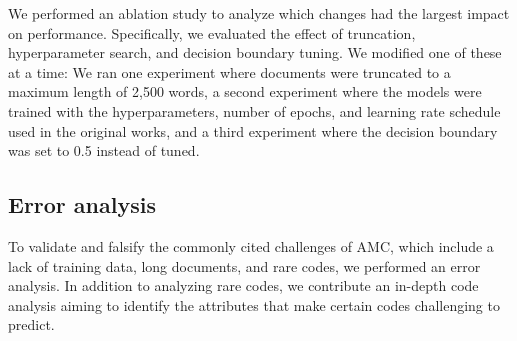 \documentclass[anonymous=false, sigconf=true, review=false, natbib=true]{acmart}
\begin{document}
We performed an ablation study to analyze which changes had the largest impact on performance. 
Specifically, we evaluated the effect of truncation, hyperparameter search, and decision boundary tuning. We modified one of these at a time: We ran one experiment where documents were truncated to a maximum length of 2,500 words, a second experiment where the models were trained with the hyperparameters, number of epochs, and learning rate schedule used in the original works, and a third experiment where the decision boundary was set to 0.5 instead of tuned.
























        
\subsection{Error analysis}
To validate and falsify the commonly cited challenges of AMC, which include a lack of training data, long documents, and rare codes, we performed an error analysis. In addition to analyzing rare codes, we contribute an in-depth code analysis aiming to identify the attributes that make certain codes challenging to predict.
\end{document}
